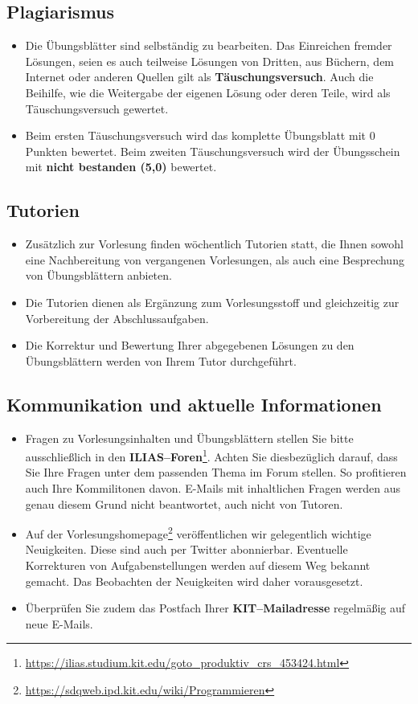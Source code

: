 \subsection*{Plagiarismus}
\begin{itemize}
	\item Die Übungsblätter sind selbständig zu bearbeiten. Das Einreichen fremder
	Lösungen, seien es auch teilweise Lösungen von Dritten, aus Büchern, dem
	Internet oder anderen Quellen gilt als \textbf{Täuschungsversuch}. Auch die
	Beihilfe, wie die Weitergabe der eigenen Lösung oder deren Teile, wird
	als Täuschungsversuch gewertet.
	\item Beim ersten Täuschungsversuch wird das komplette Übungsblatt mit 0 Punkten bewertet. Beim zweiten Täuschungsversuch wird der Übungsschein mit \textbf{\glqq nicht bestanden (5,0)\grqq} bewertet.
\end{itemize}

\subsection*{Tutorien}
\begin{itemize}
	\item Zusätzlich zur Vorlesung finden wöchentlich Tutorien statt, die Ihnen sowohl eine Nachbereitung von vergangenen Vorlesungen, als auch eine Besprechung von Übungsblättern anbieten. 
	\item Die Tutorien dienen als Ergänzung zum Vorlesungsstoff und gleichzeitig zur Vorbereitung der Abschlussaufgaben.
	\item Die Korrektur und Bewertung Ihrer abgegebenen Lösungen zu den
	Übungsblättern werden von Ihrem Tutor durchgeführt.
\end{itemize}

\subsection*{Kommunikation und aktuelle Informationen}
\begin{itemize}
	\item Fragen zu Vorlesungsinhalten und Übungsblättern stellen Sie bitte
	ausschließlich in den
	\textbf{ILIAS--Foren}\footnote{\url{https://ilias.studium.kit.edu/goto_produktiv_crs_453424.html}}.
	Achten Sie diesbezüglich darauf, dass Sie Ihre Fragen unter dem passenden Thema
	im Forum stellen. So profitieren auch Ihre Kommilitonen davon. E-Mails mit inhaltlichen Fragen werden aus genau diesem Grund nicht beantwortet, auch nicht von Tutoren.
	\item Auf der Vorlesungshomepage\footnote{\url{https://sdqweb.ipd.kit.edu/wiki/Programmieren}} veröffentlichen wir gelegentlich wichtige Neuigkeiten. Diese sind auch per Twitter abonnierbar. Eventuelle Korrekturen von Aufgabenstellungen werden auf diesem Weg bekannt gemacht. Das Beobachten der Neuigkeiten wird daher vorausgesetzt.
	\item Überprüfen Sie zudem das Postfach Ihrer \textbf{KIT--Mailadresse}
	regelmäßig auf neue E-Mails.
\end{itemize}
